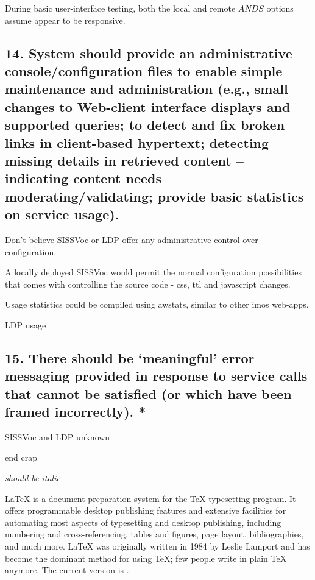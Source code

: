 \documentclass[10pt,a4paper]{article}
\begin{document}
\begin{flushleft}
During basic user-interface testing, both the local and remote \(ANDS\) options assume appear to be 
responsive. 



\subsection{  14. System should provide an administrative console/configuration
files to enable simple maintenance and administration (e.g., small changes to
Web-client interface displays and supported queries; to detect and fix broken
links in client-based hypertext; detecting missing details in retrieved content
– indicating content needs moderating/validating; provide basic statistics on
service usage).
}

Don't believe SISSVoc or LDP offer any administrative control over configuration. 

A locally deployed SISSVoc would permit the normal configuration possibilities that comes with controlling the
source code - css, ttl and javascript changes.

Usage statistics could be compiled using awstats, similar to other imos
web-apps. 

LDP usage 


\subsection{ 
15. There should be ‘meaningful’ error messaging provided in response to
service calls that cannot be satisfied (or which have been framed incorrectly).
* }

SISSVoc and LDP unknown 





\clearpage



end crap

  \end{flushleft}


  \textit{should be italic}


\LaTeX{} is a document preparation system for the \TeX{}
  typesetting program. It offers programmable desktop
  publishing features and extensive facilities for
  automating most aspects of typesetting and desktop
  publishing, including numbering and cross-referencing,
  tables and figures, page layout, bibliographies, and
  much more. \LaTeX{} was originally written in 1984 by
  Leslie Lamport and has become the dominant method for
  using \TeX; few people write in plain \TeX{} anymore.
  The current version is \LaTeXe.
\end{document}

